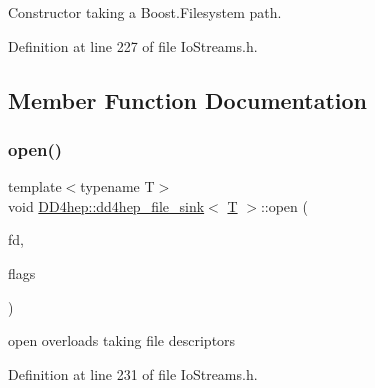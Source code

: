 Constructor taking a Boost.\+Filesystem path. 



Definition at line 227 of file Io\+Streams.\+h.



\subsection{Member Function Documentation}
\hypertarget{class_d_d4hep_1_1dd4hep__file__sink_a55c1fa794f9474e51d6489496843e358}{}\label{class_d_d4hep_1_1dd4hep__file__sink_a55c1fa794f9474e51d6489496843e358} 
\subsubsection{\texorpdfstring{open()}{open()}\hspace{0.1cm}{\footnotesize\ttfamily [1/4]}}
{\footnotesize\ttfamily template$<$typename T$>$ \\
void \hyperlink{class_d_d4hep_1_1dd4hep__file__sink}{D\+D4hep\+::dd4hep\+\_\+file\+\_\+sink}$<$ \hyperlink{class_t}{T} $>$\+::open (\begin{DoxyParamCaption}\item[{\hyperlink{class_d_d4hep_1_1dd4hep__file_a4d79f8d433cd7831ff818691424cd6fc}{handle\+\_\+type}}]{fd,  }\item[{\hyperlink{namespace_d_d4hep_a31d19f9b0ce567067d2897fbda1761e5}{dd4hep\+\_\+file\+\_\+flags}}]{flags }\end{DoxyParamCaption})\hspace{0.3cm}{\ttfamily [inline]}}



open overloads taking file descriptors 



Definition at line 231 of file Io\+Streams.\+h.

\hypertarget{class_d_d4hep_1_1dd4hep__file__sink_a5b7bcc7d6d67664ffa22bd8115903a7a}{}\label{class_d_d4hep_1_1dd4hep__file__sink_a5b7bcc7d6d67664ffa22bd8115903a7a} 
